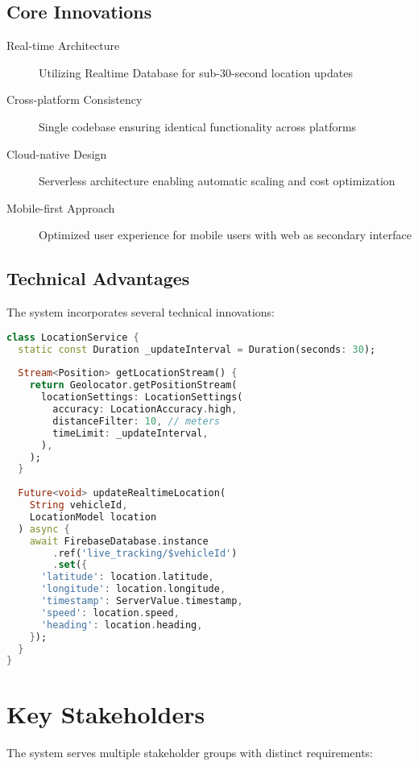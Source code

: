 \subsection{Core Innovations}
\begin{description}
    \item[Real-time Architecture] Utilizing \firebase{} Realtime Database for sub-30-second location updates
    \item[Cross-platform Consistency] Single \flutter{} codebase ensuring identical functionality across platforms
    \item[Cloud-native Design] Serverless architecture enabling automatic scaling and cost optimization
    \item[Mobile-first Approach] Optimized user experience for mobile users with web as secondary interface
\end{description}

\subsection{Technical Advantages}
The system incorporates several technical innovations:

\begin{lstlisting}[language=Dart, caption={Real-time Location Update Implementation}, label={lst:realtime_update}]
class LocationService {
  static const Duration _updateInterval = Duration(seconds: 30);
  
  Stream<Position> getLocationStream() {
    return Geolocator.getPositionStream(
      locationSettings: LocationSettings(
        accuracy: LocationAccuracy.high,
        distanceFilter: 10, // meters
        timeLimit: _updateInterval,
      ),
    );
  }
  
  Future<void> updateRealtimeLocation(
    String vehicleId, 
    LocationModel location
  ) async {
    await FirebaseDatabase.instance
        .ref('live_tracking/$vehicleId')
        .set({
      'latitude': location.latitude,
      'longitude': location.longitude,
      'timestamp': ServerValue.timestamp,
      'speed': location.speed,
      'heading': location.heading,
    });
  }
}
\end{lstlisting}

\section{Key Stakeholders}
\label{sec:stakeholders}

The system serves multiple stakeholder groups with distinct requirements:

